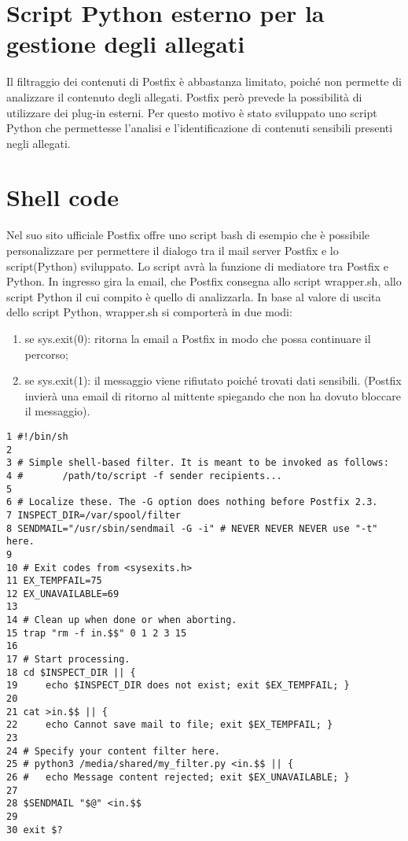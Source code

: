     \section{Script Python esterno per la gestione degli allegati}
    Il filtraggio dei contenuti di Postfix è abbastanza limitato, poiché non permette di analizzare il contenuto
    degli allegati. Postfix però prevede la possibilità di utilizzare dei plug-in esterni. Per questo motivo è stato
    sviluppato uno script Python che permettesse l'analisi e l'identificazione di contenuti sensibili presenti 
    negli allegati.


    \section{Shell code}
    Nel suo sito ufficiale Postfix offre uno script bash di esempio che è possibile personalizzare per  
    permettere il dialogo tra il mail server Postfix e lo script(Python) sviluppato. Lo script avrà la funzione di mediatore tra Postfix e Python. 
    In ingresso gira la email, che Postfix consegna allo script wrapper.sh, allo script Python 
    il cui compito è quello di analizzarla.
    In base al valore di uscita dello script Python, wrapper.sh si comporterà in due modi:

    
    \begin{enumerate}
        \item se sys.exit(0): ritorna la email a Postfix in modo che possa continuare il percorso;
        \item se sys.exit(1): il messaggio viene rifiutato poiché trovati dati sensibili. (Postfix invierà una 
        email di ritorno al mittente spiegando che non ha dovuto bloccare il messaggio). 
    \end{enumerate}

    \begin{verbatim}
1 #!/bin/sh
2 
3 # Simple shell-based filter. It is meant to be invoked as follows:
4 #       /path/to/script -f sender recipients...
5 
6 # Localize these. The -G option does nothing before Postfix 2.3.
7 INSPECT_DIR=/var/spool/filter
8 SENDMAIL="/usr/sbin/sendmail -G -i" # NEVER NEVER NEVER use "-t" here.
9 
10 # Exit codes from <sysexits.h>
11 EX_TEMPFAIL=75
12 EX_UNAVAILABLE=69
13 
14 # Clean up when done or when aborting.
15 trap "rm -f in.$$" 0 1 2 3 15
16 
17 # Start processing.
18 cd $INSPECT_DIR || {
19     echo $INSPECT_DIR does not exist; exit $EX_TEMPFAIL; }
20 
21 cat >in.$$ || { 
22     echo Cannot save mail to file; exit $EX_TEMPFAIL; }
23 
24 # Specify your content filter here.
25 # python3 /media/shared/my_filter.py <in.$$ || {
26 #   echo Message content rejected; exit $EX_UNAVAILABLE; }
27 
28 $SENDMAIL "$@" <in.$$
29 
30 exit $?
    \end{verbatim}


